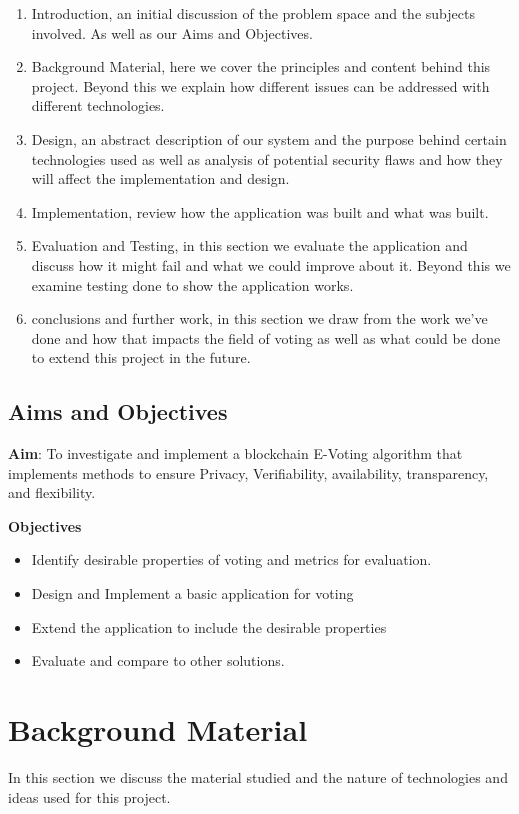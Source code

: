 \documentclass{entcs}
\begin{document}
\begin{enumerate}
    \item Introduction, an initial discussion of the problem space and the subjects involved. As well as our Aims and Objectives.
    \item Background Material, here we cover the principles and content behind this project. Beyond this we explain how different issues can be addressed with different technologies.
    \item Design, an abstract description of our system and the purpose behind certain technologies used as well as analysis of potential security flaws and how they will affect the implementation and design.
    \item Implementation, review how the application was built and what was built.
    \item Evaluation and Testing, in this section we evaluate the application and discuss how it might fail and what we could improve about it. Beyond this we examine testing done to show the application works.
    \item conclusions and further work, in this section we draw from the work we've done and how that impacts the field of voting as well as what could be done to extend this project in the future.
\end{enumerate}

\subsection{Aims and Objectives}
\begin{center}
    {\bf Aim}: To investigate and implement a blockchain E-Voting algorithm that implements methods to ensure Privacy, Verifiability, availability, transparency, and flexibility. 
\end{center}
{\bf Objectives}
\begin{itemize}
    \item Identify desirable properties of voting and metrics for evaluation.
    \item Design and Implement a basic application for voting
    \item Extend the application to include the desirable properties
    \item Evaluate and compare to other solutions.
\end{itemize}


\section{Background Material}
In this section we discuss the material studied and the nature of technologies and ideas used for this project.
\end{document}
